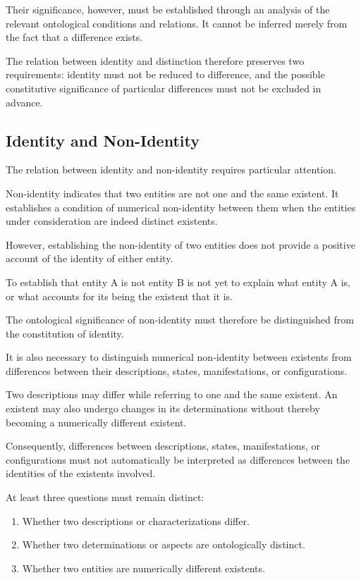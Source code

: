 Their significance, however, must be established
through an analysis of the relevant ontological
conditions and relations. It cannot be inferred
merely from the fact that a difference exists.

The relation between identity and distinction
therefore preserves two requirements: identity
must not be reduced to difference, and the
possible constitutive significance of particular
differences must not be excluded in advance.

\subsection{Identity and Non-Identity}

The relation between identity and non-identity
requires particular attention.

Non-identity indicates that two entities are
not one and the same existent. It establishes
a condition of numerical non-identity between
them when the entities under consideration
are indeed distinct existents.

However, establishing the non-identity of two
entities does not provide a positive account
of the identity of either entity.

To establish that entity A is not entity B is
not yet to explain what entity A is, or what
accounts for its being the existent that it is.

The ontological significance of non-identity
must therefore be distinguished from the
constitution of identity.

It is also necessary to distinguish numerical
non-identity between existents from differences
between their descriptions, states, manifestations,
or configurations.

Two descriptions may differ while referring
to one and the same existent. An existent may
also undergo changes in its determinations
without thereby becoming a numerically
different existent.

Consequently, differences between descriptions,
states, manifestations, or configurations
must not automatically be interpreted as
differences between the identities of the
existents involved.

At least three questions must remain distinct:

\begin{enumerate}
    \item Whether two descriptions or
    characterizations differ.
    \item Whether two determinations or aspects
    are ontologically distinct.
    \item Whether two entities are numerically
    different existents.
\end{enumerate}

